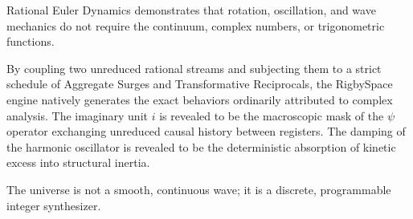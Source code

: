 \documentclass[11pt, letterpaper]{article}
\newcommand{\psiop}{\psi}
\begin{document}
Rational Euler Dynamics demonstrates that rotation, oscillation, and wave mechanics do not require the continuum, complex numbers, or trigonometric functions. 

By coupling two unreduced rational streams and subjecting them to a strict schedule of Aggregate Surges and Transformative Reciprocals, the RigbySpace engine natively generates the exact behaviors ordinarily attributed to complex analysis. The imaginary unit $i$ is revealed to be the macroscopic mask of the $\psiop$ operator exchanging unreduced causal history between registers. The damping of the harmonic oscillator is revealed to be the deterministic absorption of kinetic excess into structural inertia. 

The universe is not a smooth, continuous wave; it is a discrete, programmable integer synthesizer.
\end{document}
